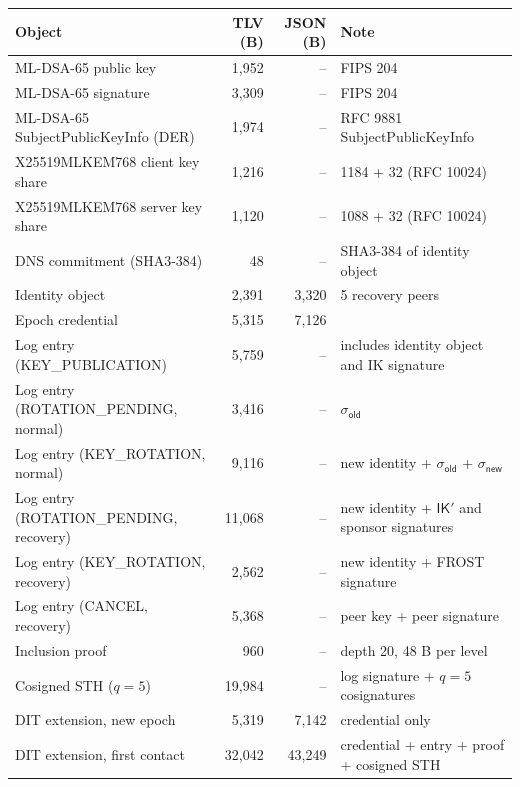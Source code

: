 \begin{tabular}{lrrl}
\toprule
Object & TLV (B) & JSON (B) & Note \\
\midrule
ML-DSA-65 public key & 1{,}952 & -- & FIPS 204 \\
ML-DSA-65 signature & 3{,}309 & -- & FIPS 204 \\
ML-DSA-65 SubjectPublicKeyInfo (DER) & 1{,}974 & -- & RFC 9881 SubjectPublicKeyInfo \\
X25519MLKEM768 client key share & 1{,}216 & -- & 1184 + 32 (RFC 10024) \\
X25519MLKEM768 server key share & 1{,}120 & -- & 1088 + 32 (RFC 10024) \\
DNS commitment (SHA3-384) & 48 & -- & SHA3-384 of identity object \\
Identity object & 2{,}391 & 3{,}320 & 5 recovery peers \\
Epoch credential & 5{,}315 & 7{,}126 &  \\
Log entry (KEY\_PUBLICATION) & 5{,}759 & -- & includes identity object and IK signature \\
Log entry (ROTATION\_PENDING, normal) & 3{,}416 & -- & $\sigma_{\mathsf{old}}$ \\
Log entry (KEY\_ROTATION, normal) & 9{,}116 & -- & new identity + $\sigma_{\mathsf{old}}$ + $\sigma_{\mathsf{new}}$ \\
Log entry (ROTATION\_PENDING, recovery) & 11{,}068 & -- & new identity + $\mathsf{IK}'$ and sponsor signatures \\
Log entry (KEY\_ROTATION, recovery) & 2{,}562 & -- & new identity + FROST signature \\
Log entry (CANCEL, recovery) & 5{,}368 & -- & peer key + peer signature \\
Inclusion proof & 960 & -- & depth 20, 48 B per level \\
Cosigned STH ($q=5$) & 19{,}984 & -- & log signature + $q=5$ cosignatures \\
DIT extension, new epoch & 5{,}319 & 7{,}142 & credential only \\
DIT extension, first contact & 32{,}042 & 43{,}249 & credential + entry + proof + cosigned STH \\
\bottomrule
\end{tabular}
